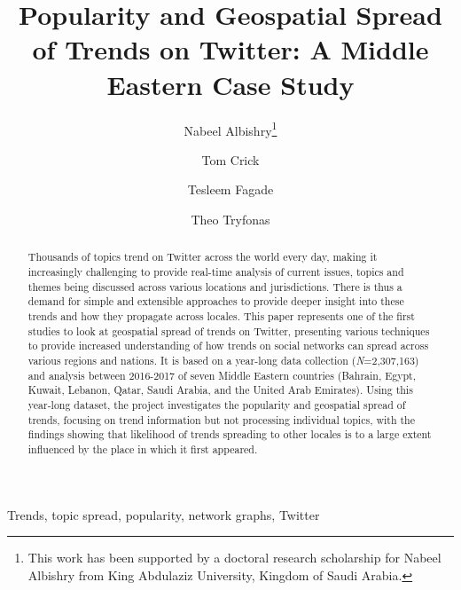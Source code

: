 \documentclass{llncs}
\begin{document}
\title{Popularity and Geospatial Spread of Trends on Twitter: A Middle
Eastern Case Study}

\author{Nabeel Albishry\thanks{This work has been supported by a doctoral research scholarship for
Nabeel Albishry from King Abdulaziz University, Kingdom of Saudi
Arabia.} \and Tom
  Crick \and Tesleem Fagade \and Theo Tryfonas}


\maketitle

\begin{abstract}
Thousands of topics trend on Twitter across the world every day,
making it increasingly challenging to provide real-time analysis of
current issues, topics and themes being discussed across various
locations and jurisdictions. There is thus a demand for simple and
extensible approaches to provide deeper insight into these trends and
how they propagate across locales. This paper represents one of the
first studies to look at geospatial spread of trends on Twitter,
presenting various techniques to provide increased understanding of
how trends on social networks can spread across various regions and
nations. It is based on a year-long data collection
({\emph{N}}=2,307,163) and analysis between 2016-2017 of seven Middle
Eastern countries (Bahrain, Egypt, Kuwait, Lebanon, Qatar, Saudi
Arabia, and the United Arab Emirates). Using this year-long dataset,
the project investigates the popularity and geospatial spread of
trends, focusing on trend information but not processing individual
topics, with the findings showing that likelihood of trends spreading
to other locales is to a large extent influenced by the place in which
it first appeared.
 \end{abstract}

\begin{keywords}
Trends, topic spread, popularity, network graphs, Twitter
\end{keywords}
\end{document}

